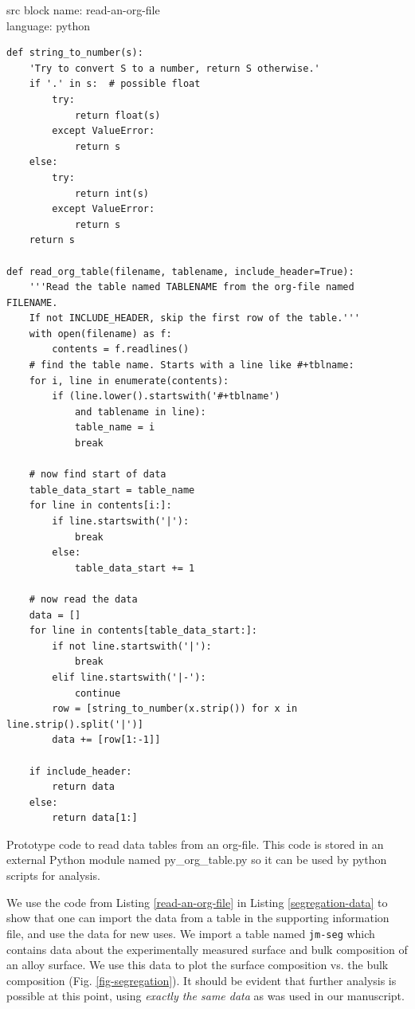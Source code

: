 \documentclass[journal=accacs,manuscript=article,email=true]{achemso}
\begin{document}
\begin{tcolorbox}
src block name: read-an-org-file\\language: python\begin{listing}[H]
\begin{verbatim}
def string_to_number(s):
    'Try to convert S to a number, return S otherwise.'
    if '.' in s:  # possible float
        try:
            return float(s)
        except ValueError:
            return s
    else:
        try:
            return int(s)
        except ValueError:
            return s
    return s

def read_org_table(filename, tablename, include_header=True):
    '''Read the table named TABLENAME from the org-file named FILENAME.
    If not INCLUDE_HEADER, skip the first row of the table.'''
    with open(filename) as f:
        contents = f.readlines()
    # find the table name. Starts with a line like #+tblname:
    for i, line in enumerate(contents):
        if (line.lower().startswith('#+tblname')
            and tablename in line):
            table_name = i
            break

    # now find start of data
    table_data_start = table_name
    for line in contents[i:]:
        if line.startswith('|'):
            break
        else:
            table_data_start += 1

    # now read the data
    data = []
    for line in contents[table_data_start:]:
        if not line.startswith('|'):
            break
        elif line.startswith('|-'):
            continue
        row = [string_to_number(x.strip()) for x in line.strip().split('|')]
        data += [row[1:-1]]

    if include_header:
        return data
    else:
        return data[1:]
\end{verbatim}
\caption{\label{read-an-org-file}Prototype code to read data tables from an org-file. This code is stored in an external Python module named py\_org\_table.py so it can be used by python scripts for analysis.}
\end{listing}
\end{tcolorbox}

We use the code from Listing \ref{read-an-org-file} in Listing \ref{segregation-data} to  show that one can import the data from a table in the supporting information file, and use the data for new uses. We import a table named \texttt{jm-seg} which contains data about the experimentally measured surface and bulk composition of an alloy surface. We use this data to plot the surface composition vs. the bulk composition (Fig. \ref{fig-segregation}). It should be evident that further analysis is possible at this point, using \emph{exactly the same data} as was used in our manuscript.
\end{document}
